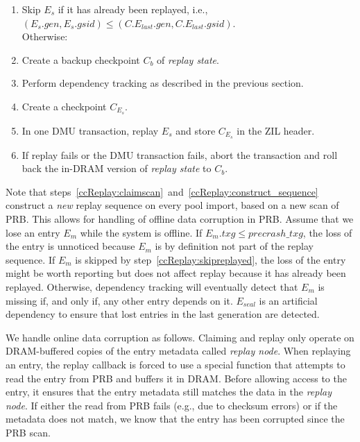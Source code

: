 \documentclass[12pt,a4paper,twoside]{book}
\begin{document}
\begin{enumerate}[noitemsep,beginpenalty=100000,midpenalty=100000]
        \begin{enumerate}[noitemsep,beginpenalty=100000,midpenalty=100000]
            \item \label{ccReplay:skipreplayed} Skip $E_s$ if it has already been replayed, i.e., \\
            \mbox{$(E_s.gen, E_s.gsid) \le (C.E_{last}.gen, C.E_{last}.gsid)$}. \\
            Otherwise:
            \item Create a backup checkpoint $C_b$ of \textit{replay state}.
            \item Perform dependency tracking as described in the previous section.
            \item Create a checkpoint $C_{E_s}$.
            \item In one DMU transaction, replay $E_s$ and store $C_{E_s}$ in the ZIL header.
            \item If replay fails or the DMU transaction fails, abort the transaction and roll back the in-DRAM version of \textit{replay state} to $C_b$.
    \end{enumerate}
\end{enumerate}

Note that steps~\ref{ccReplay:claimscan}~and~\ref{ccReplay:construct_sequence} construct a \textit{new} replay sequence on every pool import, based on a new scan of PRB.
This allows for handling of offline data corruption in PRB.
Assume that we lose an entry $E_m$ while the system is offline.
If \mbox{$E_m.txg \le precrash\_txg$}, the loss of the entry is unnoticed because $E_m$ is by definition not part of the replay sequence.
If $E_m$ is skipped by step~\ref{ccReplay:skipreplayed}, the loss of the entry might be worth reporting but does not affect replay because it has already been replayed.
Otherwise, dependency tracking will eventually detect that $E_m$ is missing if, and only if, any other entry depends on it.
$E_{seal}$ is an artificial dependency to ensure that lost entries in the last generation are detected.

We handle online data corruption as follows.
Claiming and replay only operate on DRAM-buffered copies of the entry metadata called \textit{replay node}.
When replaying an entry, the replay callback is forced to use a special function that attempts to read the entry from PRB and buffers it in DRAM.
Before allowing access to the entry, it ensures that the entry metadata still matches the data in the \textit{replay node}.
If either the read from PRB fails (e.g., due to checksum errors) or if the metadata does not match, we know that the entry has been corrupted since the PRB scan.
\end{document}
